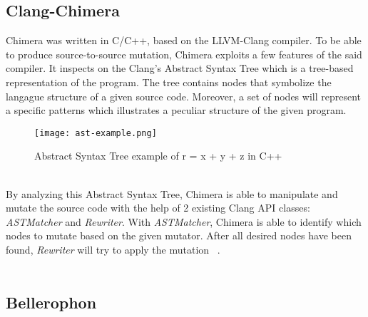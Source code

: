 \subsection{Clang-Chimera}

Chimera was written in C/C++, based on the LLVM-Clang compiler. To be able to produce source-to-source mutation, Chimera exploits a few features of the said compiler. It inspects on the Clang's Abstract Syntax Tree which is a tree-based representation of the program. The tree contains nodes that symbolize the langague structure of a given source code. Moreover, a set of nodes will represent a specific patterns which illustrates a peculiar structure of the given program. \\
\newpage
\begin{figure}[H]
\texttt{[image: ast-example.png]}
\centering
\caption{Abstract Syntax Tree example of r = x + y + z in C++}
\end{figure}
~\\
By analyzing this Abstract Syntax Tree, Chimera is able to manipulate and mutate the source code with the help of 2 existing Clang API classes: \textit{ASTMatcher} and \textit{Rewriter}. With \textit{ASTMatcher}, Chimera is able to identify which nodes to mutate based on the given mutator. After all desired nodes have been found, \textit{Rewriter} will try to apply the mutation ~\cite{iideaa}. \\
~\\

\subsection{Bellerophon}

